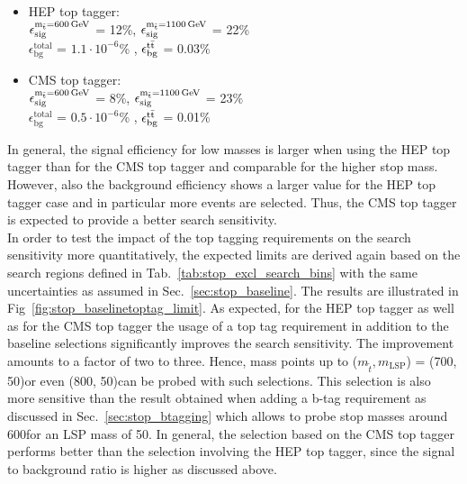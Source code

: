 \begin{itemize}
 \item HEP top tagger: \\
$\epsilon_\mathrm{sig}^\mathrm{m_{\tilde{t}} = 600\,\text{Ge}\kern-0.06667em\text{V}}$ = 12\%, $\epsilon_\mathrm{sig}^\mathrm{m_{\tilde{t}} = 1100\,\text{Ge}\kern-0.06667em\text{V}}$ = 22\% \\
$\epsilon_\mathrm{bg}^\mathrm{total}$ = $1.1 \cdot 10^{-6}$\% , $\epsilon_\mathrm{bg}^\mathrm{t\bar{t}}$ = 0.03\% 
 \item CMS top tagger: \\
$\epsilon_\mathrm{sig}^\mathrm{m_{\tilde{t}} = 600\,\text{Ge}\kern-0.06667em\text{V}}$ = 8\%, $\epsilon_\mathrm{sig}^\mathrm{m_{\tilde{t}} = 1100\,\text{Ge}\kern-0.06667em\text{V}}$ = 23\% \\
$\epsilon_\mathrm{bg}^\mathrm{total}$ = $0.5 \cdot 10^{-6}$\% , $\epsilon_\mathrm{bg}^\mathrm{t\bar{t}}$ = 0.01\% 
\end{itemize}
In general, the signal efficiency for low masses is larger when using the HEP top tagger than for the CMS top tagger and comparable for the higher stop mass. However, also the background efficiency shows a larger value for the HEP top tagger case and in particular more \ttbar events are selected. Thus, the CMS top tagger is expected to provide a better search sensitivity. \\
In order to test the impact of the top tagging requirements on the search sensitivity more quantitatively, the expected limits are derived again based on the search regions defined in Tab.~\ref{tab:stop_excl_search_bins} with the same uncertainties as assumed in Sec.~\ref{sec:stop_baseline}. The results are illustrated in Fig~\ref{fig:stop_baselinetoptag_limit}. As expected, for the HEP top tagger as well as for the CMS top tagger the usage of a top tag requirement in addition to the baseline selections significantly improves the search sensitivity. The improvement amounts to a factor of two to three. Hence, mass points up to ($m_{\tilde{t}}, m_\mathrm{LSP}$) = (700, 50)\gev or even (800, 50)\gev can be probed with such selections. This selection is also more sensitive than the result obtained when adding a b-tag requirement as discussed in Sec.~\ref{sec:stop_btagging} which allows to probe stop masses around 600\gev for an LSP mass of 50\gev. In general, the selection based on the CMS top tagger performs better than the selection involving the HEP top tagger, since the signal to background ratio is higher as discussed above. 

